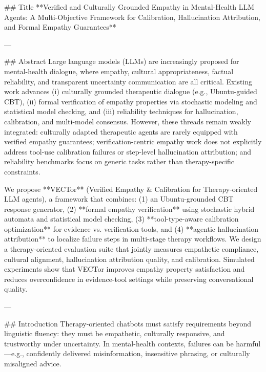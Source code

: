 ## Title  
**Verified and Culturally Grounded Empathy in Mental-Health LLM Agents: A Multi-Objective Framework for Calibration, Hallucination Attribution, and Formal Empathy Guarantees**

---

## Abstract  
Large language models (LLMs) are increasingly proposed for mental-health dialogue, where empathy, cultural appropriateness, factual reliability, and transparent uncertainty communication are all critical. Existing work advances (i) culturally grounded therapeutic dialogue (e.g., Ubuntu-guided CBT), (ii) formal verification of empathy properties via stochastic modeling and statistical model checking, and (iii) reliability techniques for hallucination, calibration, and multi-model consensus. However, these threads remain weakly integrated: culturally adapted therapeutic agents are rarely equipped with verified empathy guarantees; verification-centric empathy work does not explicitly address tool-use calibration failures or step-level hallucination attribution; and reliability benchmarks focus on generic tasks rather than therapy-specific constraints.  

We propose **VECTor** (Verified Empathy & Calibration for Therapy-oriented LLM agents), a framework that combines: (1) an Ubuntu-grounded CBT response generator, (2) **formal empathy verification** using stochastic hybrid automata and statistical model checking, (3) **tool-type-aware calibration optimization** for evidence vs. verification tools, and (4) **agentic hallucination attribution** to localize failure steps in multi-stage therapy workflows. We design a therapy-oriented evaluation suite that jointly measures empathetic compliance, cultural alignment, hallucination attribution quality, and calibration. Simulated experiments show that VECTor improves empathy property satisfaction and reduces overconfidence in evidence-tool settings while preserving conversational quality.

---

## Introduction  
Therapy-oriented chatbots must satisfy requirements beyond linguistic fluency: they must be empathetic, culturally responsive, and trustworthy under uncertainty. In mental-health contexts, failures can be harmful—e.g., confidently delivered misinformation, insensitive phrasing, or culturally misaligned advice.

